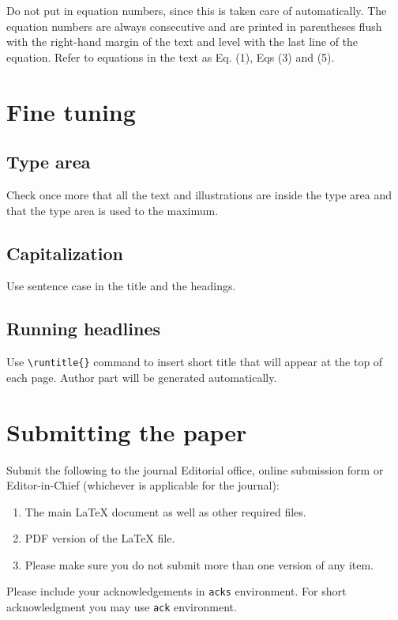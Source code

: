 \documentclass[bsi]{iosart2x}
\begin{document}
Do not put in equation numbers, since this is taken care of
automatically. The equation numbers are always consecutive and are
printed in parentheses flush with the right-hand margin of the text and
level with the last line of the equation.
Refer to equations in the text as Eq. (1), Eqs (3) and (5).


\section{Fine tuning}
\subsection{Type area}
Check once more that all the text and illustrations are inside the type area and
that the type area is used to the maximum.

\subsection{Capitalization}
Use sentence case in the title and the headings.

\subsection{Running headlines}
Use \verb|\runtitle{}| command to insert short title that will appear at the top of each page. Author part will be generated automatically.

\section{Submitting the paper}
Submit the following to the journal Editorial office, online submission form or Editor-in-Chief (whichever is applicable for the journal):

\begin{enumerate}
\item The main \LaTeX{} document as well as other required files.
\item PDF version of the \LaTeX{} file.
\item Please make sure you do not submit more than one version of any item.
\end{enumerate}


\begin{acks}
Please include your acknowledgements in \verb|acks| environment. For short acknowledgment you may use \verb|ack| environment.
\end{acks}
\end{document}
